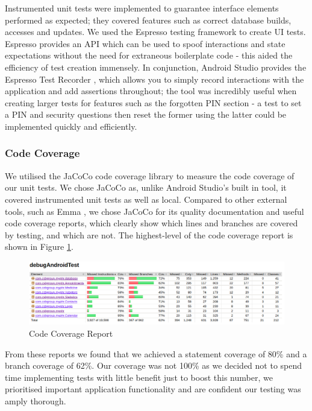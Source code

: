 \documentclass{l3proj}
\begin{document}
Instrumented unit tests were implemented to guarantee interface elements performed as expected; they covered features such as correct database builds, accesses and updates.  We used the Espresso testing framework \cite{espresso} to create UI tests. Espresso provides an API which can be used to spoof interactions and state expectations without the need for extraneous boilerplate code - this aided the efficiency of test creation immensely. In conjunction, Android Studio provides the Espresso Test Recorder \cite{espresso-recorder}, which allows you to simply record interactions with the application and add assertions throughout; the tool was incredibly useful when creating larger tests for features such as the forgotten PIN section - a test to set a PIN and security questions then reset the former using the latter could be implemented quickly and efficiently.


\subsubsection{Code Coverage} \label{sec:3.5.2}
We utilised the JaCoCo code coverage library \cite{jacoco} to measure the code coverage of our unit tests. We chose JaCoCo as, unlike Android Studio's built in tool, it covered instrumented unit tests as well as local. Compared to other external tools, such as Emma \cite{Emma}, we chose JaCoCo for its quality documentation and useful code coverage reports, which clearly show which lines and branches are covered by testing, and which are not. The highest-level of the code coverage report is shown in Figure \ref{fig:code-coverage}.

\begin{figure}[ht]
  \includegraphics[width=\linewidth]{figures/code_coverage.png}
  \caption{Code Coverage Report}
  \label{fig:code-coverage}
\end{figure}

From these reports we found that we achieved a statement coverage of 80\% and a branch coverage of 62\%. Our coverage was not 100\% as we decided not to spend time implementing tests with little benefit just to boost this number, we prioritised important application functionality and are confident our testing was amply thorough.
\end{document}
